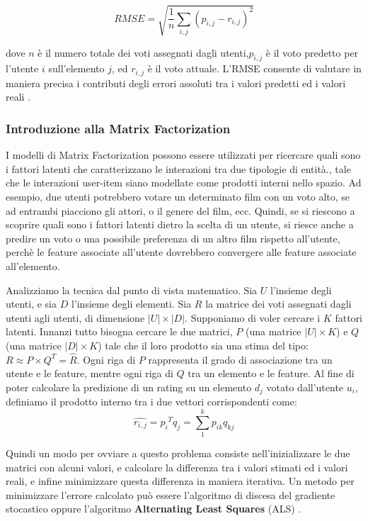 \documentclass[12pt]{article}
\begin{document}
\[ RMSE=\sqrt{\frac{1}{n}\sum_{{i,j}}(p_{i,j}-r_{i,j})^2} \]

dove $n$ è il numero totale dei voti assegnati dagli utenti,$p_{i,j}$ è il voto predetto per l'utente $i$ sull'elemento $j$, ed $r_{i,j}$ è il voto attuale. L'RMSE consente di valutare in maniera precisa i contributi degli errori assoluti tra i valori predetti ed i valori reali \cite{Su:2009:SCF:1592474.1722966}.
 
\subsubsection{Introduzione alla Matrix Factorization}
I modelli di Matrix Factorization possono essere utilizzati per ricercare quali sono i fattori latenti che caratterizzano le interazioni tra due tipologie di entità., tale che le interazioni user-item siano modellate come prodotti interni nello spazio. Ad esempio, due utenti potrebbero votare un determinato film con un voto alto, se ad entrambi piacciono gli attori, o il genere del film, ecc. Quindi, se si riescono a scoprire quali sono i fattori latenti dietro la scelta di un utente, si riesce anche a predire un voto o una possibile preferenza di un altro film rispetto all'utente, perchè le feature associate all'utente dovrebbero convergere alle feature associate all'elemento.

Analizziamo la tecnica dal punto di vista matematico. Sia $U$ l'insieme degli utenti, e sia $D$ l'insieme degli elementi. Sia $R$ la matrice dei voti assegnati dagli utenti agli utenti, di dimensione $\lvert U\rvert\times\lvert D\rvert$. Supponiamo di voler cercare i $K$ fattori latenti. Innanzi tutto bisogna cercare le due matrici, $P$ (una matrice $\lvert U\rvert\times K$) e $Q$ (una matrice $\lvert D\rvert\times K$) tale che il loro prodotto sia una stima del tipo: $R\approx P\times Q^T=\hat{R}$. Ogni riga di $P$ rappresenta il grado di associazione tra un utente e le feature, mentre ogni riga di $Q$ tra un elemento e le feature. Al fine di poter calcolare la predizione di un rating su un elemento $d_j$ votato dall'utente $u_i$, definiamo il prodotto interno tra i due vettori corrispondenti come:
\[\hat{r_{i,j}}={p_i}^Tq_j=\sum_{1}^{k}p_{ik}q_{kj}\]

Quindi un modo per ovviare a questo problema consiste nell'inizializzare le due matrici con alcuni valori, e calcolare la differenza tra i valori stimati ed i valori reali, e infine minimizzare questa differenza in maniera iterativa. Un metodo per minimizzare l'errore calcolato può essere l'algoritmo di discesa del gradiente stocastico oppure l'algoritmo \textbf{Alternating Least Squares} (ALS) \cite{Takacs:2008:MFN:1454008.1454049}.
\end{document}
